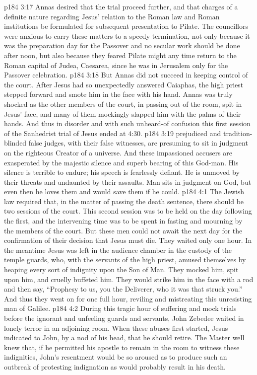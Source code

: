 \vs p184 3:17 Annas desired that the trial proceed further, and that charges of a definite nature regarding Jesus’ relation to the Roman law and Roman institutions be formulated for subsequent presentation to Pilate. The councillors were anxious to carry these matters to a speedy termination, not only because it was the preparation day for the Passover and no secular work should be done after noon, but also because they feared Pilate might any time return to the Roman capital of Judea, Caesarea, since he was in Jerusalem only for the Passover celebration.
\vs p184 3:18 But Annas did not succeed in keeping control of the court. After Jesus had so unexpectedly answered Caiaphas, the high priest stepped forward and smote him in the face with his hand. Annas was truly shocked as the other members of the court, in passing out of the room, spit in Jesus’ face, and many of them mockingly slapped him with the palms of their hands. And thus in disorder and with such unheard\hyp{}of confusion this first session of the Sanhedrist trial of Jesus ended at 4:30.
\vs p184 3:19  prejudiced and tradition\hyp{}blinded false judges, with their false witnesses, are presuming to sit in judgment on the righteous Creator of a universe. And these impassioned accusers are exasperated by the majestic silence and superb bearing of this God\hyp{}man. His silence is terrible to endure; his speech is fearlessly defiant. He is unmoved by their threats and undaunted by their assaults. Man sits in judgment on God, but even then he loves them and would save them if he could.
\vs p184 4:1 The Jewish law required that, in the matter of passing the death sentence, there should be two sessions of the court. This second session was to be held on the day following the first, and the intervening time was to be spent in fasting and mourning by the members of the court. But these men could not await the next day for the confirmation of their decision that Jesus must die. They waited only one hour. In the meantime Jesus was left in the audience chamber in the custody of the temple guards, who, with the servants of the high priest, amused themselves by heaping every sort of indignity upon the Son of Man. They mocked him, spit upon him, and cruelly buffeted him. They would strike him in the face with a rod and then say, “Prophesy to us, you the Deliverer, who it was that struck you.” And thus they went on for one full hour, reviling and mistreating this unresisting man of Galilee.
\vs p184 4:2 During this tragic hour of suffering and mock trials before the ignorant and unfeeling guards and servants, John Zebedee waited in lonely terror in an adjoining room. When these abuses first started, Jesus indicated to John, by a nod of his head, that he should retire. The Master well knew that, if he permitted his apostle to remain in the room to witness these indignities, John’s resentment would be so aroused as to produce such an outbreak of protesting indignation as would probably result in his death.
